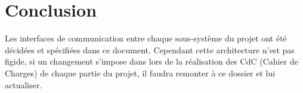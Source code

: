 \section{Conclusion}

Les interfaces de communication entre chaque sous-système du projet ont été décidées et spécifiées dans ce document. Cependant cette architecture n'est pas figide, si un changement s’impose dans lors de la réalisation des CdC (Cahier de Charges) de chaque partie du projet, il faudra remonter à ce dossier et lui actualiser.
